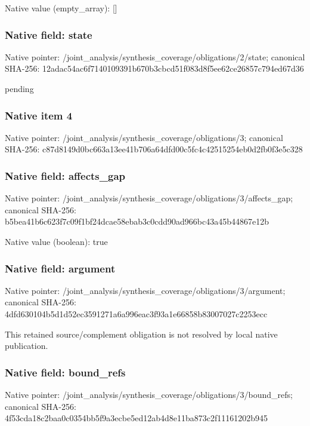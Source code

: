 \documentclass[10pt,a4paper]{article}
\begin{document}
Native value (empty\_\allowbreak{}array): []

\subsubsection{Native field: state}
Native pointer: /joint\_\allowbreak{}analysis/synthesis\_\allowbreak{}coverage/obligations/2/state; canonical SHA-256: 12adac54ac6f7140109391b670b3cbcd51f083d8f5ee62ce26857c794ed67d36

\begingroup\raggedright\sloppy pending\par\endgroup

\subsubsection{Native item 4}
Native pointer: /joint\_\allowbreak{}analysis/synthesis\_\allowbreak{}coverage/obligations/3; canonical SHA-256: c87d8149d0bc663a13ee41b706a64dfd00c5fc4c42515254eb0d2fb0f3e5c328

\subsubsection{Native field: affects\_\allowbreak{}gap}
Native pointer: /joint\_\allowbreak{}analysis/synthesis\_\allowbreak{}coverage/obligations/3/affects\_\allowbreak{}gap; canonical SHA-256: b5bea41b6c623f7c09f1bf24dcae58ebab3c0cdd90ad966bc43a45b44867e12b

Native value (boolean): true

\subsubsection{Native field: argument}
Native pointer: /joint\_\allowbreak{}analysis/synthesis\_\allowbreak{}coverage/obligations/3/argument; canonical SHA-256: 4dfd630104b5d1d52ec3591271a6a996eac3f93a1e66858b83007027c2253ecc

\begingroup\raggedright\sloppy This retained source/\allowbreak{}complement obligation is not resolved by local native publication.\par\endgroup

\subsubsection{Native field: bound\_\allowbreak{}refs}
Native pointer: /joint\_\allowbreak{}analysis/synthesis\_\allowbreak{}coverage/obligations/3/bound\_\allowbreak{}refs; canonical SHA-256: 4f53cda18c2baa0c0354bb5f9a3ecbe5ed12ab4d8e11ba873c2f11161202b945
\end{document}
